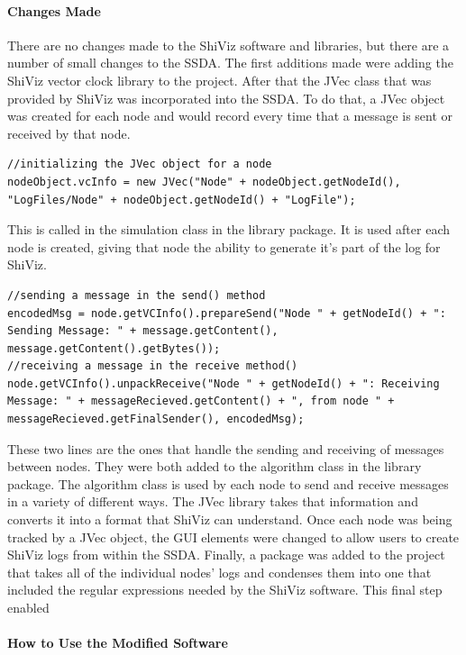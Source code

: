 \documentclass[12pt, oneside]{article}   	%
\begin{document}
\paragraph{Changes Made}

There are no changes made to the ShiViz software and libraries, but there are a number of small changes to the SSDA.  The first additions made were adding the ShiViz vector clock library to the project.  After that the JVec class that was provided by ShiViz was incorporated into the SSDA.  To do that, a JVec object was created for each node and would record every time that a message is sent or received by that node. 
\begin{lstlisting}
//initializing the JVec object for a node
nodeObject.vcInfo = new JVec("Node" + nodeObject.getNodeId(), "LogFiles/Node" + nodeObject.getNodeId() + "LogFile");
\end{lstlisting}
This is called in the simulation class in the library package.  It is used after each node is created, giving that node the ability to generate it's part of the log for ShiViz.
\begin{lstlisting}
//sending a message in the send() method
encodedMsg = node.getVCInfo().prepareSend("Node " + getNodeId() + ": Sending Message: " + message.getContent(), message.getContent().getBytes());
//receiving a message in the receive method()
node.getVCInfo().unpackReceive("Node " + getNodeId() + ": Receiving Message: " + messageRecieved.getContent() + ", from node " + messageRecieved.getFinalSender(), encodedMsg);
\end{lstlisting}
These two lines are the ones that handle the sending and receiving of messages between nodes.  They were both added to the algorithm class in the library package.  The algorithm class is used by each node to send and receive messages in a variety of different ways.  The JVec library takes that information and converts it into a format that ShiViz can understand.  Once each node was being tracked by a JVec object, the GUI elements were changed to allow users to create ShiViz logs from within the SSDA.  Finally, a package was added to the project that takes all of the individual nodes' logs and condenses them into one that included the regular expressions needed by the ShiViz software.  This final step enabled 

\paragraph{How to Use the Modified Software}
\end{document}

